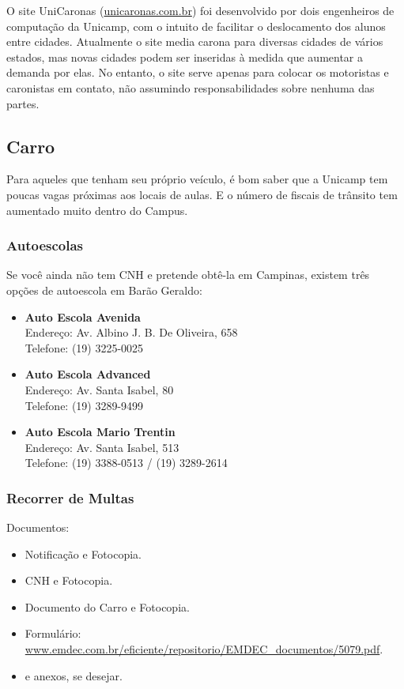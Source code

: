 O site UniCaronas (\url{unicaronas.com.br}) foi desenvolvido por dois
engenheiros de computação da Unicamp, com o intuito de facilitar o deslocamento
dos alunos entre cidades. Atualmente o site media carona para diversas cidades
de vários estados, mas novas cidades podem ser inseridas à medida que aumentar
a demanda por elas. No entanto, o site serve apenas para colocar os motoristas
e caronistas em contato, não assumindo responsabilidades sobre nenhuma das
partes.

\subsection{Carro}

Para aqueles que tenham seu próprio veículo, é bom saber que a Unicamp tem
poucas vagas próximas aos locais de aulas. E o número de fiscais de trânsito tem
aumentado muito dentro do Campus.

\subsubsection*{Autoescolas}

Se você ainda não tem CNH e pretende obtê-la em Campinas, existem três opções de
autoescola em Barão Geraldo:

\begin{itemize}
\item  \textbf{Auto Escola Avenida}
		\\Endereço: Av. Albino J. B. De Oliveira, 658
		\\Telefone: (19) 3225-0025

\item  \textbf{Auto Escola Advanced}
		\\Endereço: Av. Santa Isabel, 80
		\\Telefone: (19) 3289-9499

\item  \textbf{Auto Escola Mario Trentin}
		\\Endereço: Av. Santa Isabel, 513
		\\Telefone: (19) 3388-0513 / (19) 3289-2614
\end{itemize}

\subsubsection*{Recorrer de Multas}

Documentos:
\begin{itemize}
\item  Notificação e Fotocopia.
\item  CNH e Fotocopia.
\item  Documento do Carro e Fotocopia.
\item  Formulário: \url{www.emdec.com.br/eficiente/repositorio/EMDEC_documentos/5079.pdf}.
\item  e anexos, se desejar.
\end{itemize}

